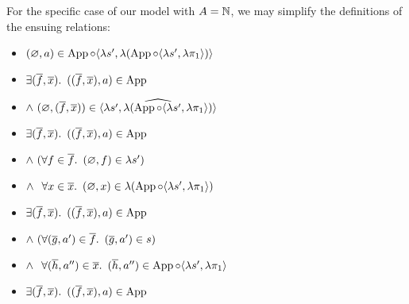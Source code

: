 For the specific case of our model with $A = \mathbb{N}$, we may simplify the definitions of the ensuing relations:
\begin{itemize}
  \item[\phantom{\imps}]
    $(\varnothing,a)\in\operatorname{App}\circ\langle\lambda s^\prime,\lambda(\operatorname{App}\circ\langle\lambda s^\prime,\lambda\pi_1\rangle)\rangle$

  \item[\iffs]
    $\exists (\overline{f},\overline{x})\ldotp~((\overline{f},\overline{x}),a)\in\operatorname{App}$

  \addtolength{\itemsep}{-.5\baselineskip}
  \item[\phantom{\imps}]
    \quad $\land~(\varnothing,(\overline{f},\overline{x}))\in\widehat{\langle\lambda s^\prime,\lambda(\operatorname{App}\circ\langle\lambda s^\prime,\lambda\pi_1\rangle)\rangle}$
  \addtolength{\itemsep}{.5\baselineskip}

  \item[\iffs]
    $\exists (\overline{f},\overline{x})\ldotp~((\overline{f},\overline{x}),a)\in\operatorname{App}$

  \addtolength{\itemsep}{-.5\baselineskip}
  \item[\phantom{\imps}]
    \quad $\land~(\forall f\in\overline{f}\ldotp~(\varnothing,f)\in\lambda s^\prime)$

  \item[\phantom{\imps}]
    \quad $\land~\phantom{(}\forall x\in\overline{x}\ldotp~(\varnothing,x)\in\lambda(\operatorname{App}\circ\langle\lambda s^\prime,\lambda\pi_1\rangle)$
  \addtolength{\itemsep}{.5\baselineskip}

  \item[\iffs]
    $\exists (\overline{f},\overline{x})\ldotp~((\overline{f},\overline{x}),a)\in\operatorname{App}$

  \addtolength{\itemsep}{-.5\baselineskip}
  \item[\phantom{\imps}]
    \quad $\land~(\forall (\overline{g},a^\prime)\in\overline{f}\ldotp~(\overline{g},a^\prime)\in s)$
    \marginnote{\Def-$\lambda\cdot$}

  \item[\phantom{\imps}]
    \quad $\land~\phantom{(}\forall (\overline{h},a^{\prime\prime})\in\overline{x}\ldotp~(\overline{h},a^{\prime\prime})\in\operatorname{App}\circ\langle\lambda s^\prime,\lambda\pi_1\rangle$
    \marginnote{\Def-$\lambda\cdot$}
  \addtolength{\itemsep}{.5\baselineskip}

  \item[\iffs]
    $\exists (\overline{f},\overline{x})\ldotp~((\overline{f},\overline{x}),a)\in\operatorname{App}$


\end{itemize}
